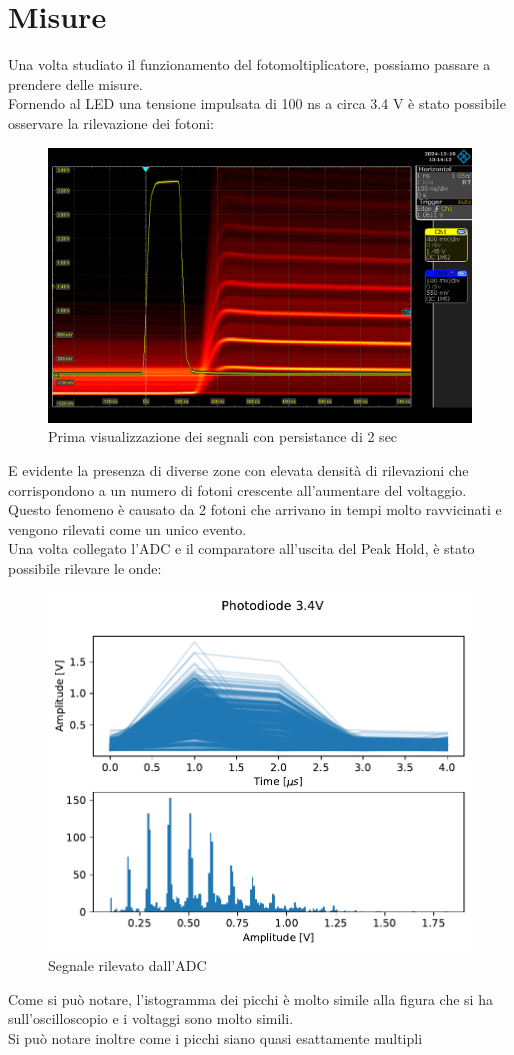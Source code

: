 \pagebreak

\section{Misure}
Una volta studiato il funzionamento del fotomoltiplicatore, possiamo passare a prendere delle misure.\\

Fornendo al LED una tensione impulsata di 100 ns a circa 3.4 V è stato possibile osservare la rilevazione dei fotoni:

\begin{figure}[!h]
    \centering
    \includegraphics[width=0.5\linewidth]{Photomultiplier/assets/SiPm/SiPm.png}
    \caption{Prima visualizzazione dei segnali con persistance di 2 sec}
\end{figure}

E evidente la presenza di diverse zone con elevata densità di rilevazioni che corrispondono a un numero di fotoni crescente all'aumentare del voltaggio. Questo fenomeno è causato da 2 fotoni che arrivano in tempi molto ravvicinati e vengono rilevati come un unico evento.\\
Una volta collegato l'ADC e il comparatore all'uscita del Peak Hold, è stato possibile rilevare le onde:

\begin{figure}[!h]
    \centering
    \includegraphics[width=0.5\linewidth]{Photomultiplier/assets/phot_3.4V.pdf}
    \caption{Segnale rilevato dall'ADC}
\end{figure}

Come si può notare, l'istogramma dei picchi è molto simile alla figura che si ha sull'oscilloscopio e i voltaggi sono molto simili.\\
Si può notare inoltre come i picchi siano quasi esattamente multipli 